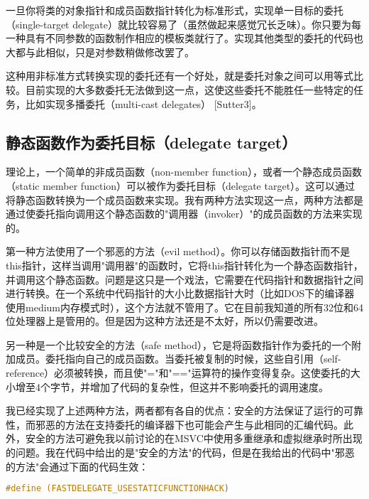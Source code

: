 \documentclass{article}
\begin{document}
\begin{CJK}{UTF8}{gbsn}
一旦你将类的对象指针和成员函数指针转化为标准形式，实现单一目标的委托（single-target delegate）就比较容易了（虽然做起来感觉冗长乏味）。你只要为每一种具有不同参数的函数制作相应的模板类就行了。实现其他类型的委托的代码也大都与此相似，只是对参数稍做修改罢了。

这种用非标准方式转换实现的委托还有一个好处，就是委托对象之间可以用等式比较。目前实现的大多数委托无法做到这一点，这使这些委托不能胜任一些特定的任务，比如实现多播委托（multi-cast delegates） [Sutter3]。

\subsection{静态函数作为委托目标（delegate target）}
理论上，一个简单的非成员函数（non-member function），或者一个静态成员函数（static member function）可以被作为委托目标（delegate target）。这可以通过将静态函数转换为一个成员函数来实现。我有两种方法实现这一点，两种方法都是通过使委托指向调用这个静态函数的"调用器（invoker）"的成员函数的方法来实现的。

第一种方法使用了一个邪恶的方法（evil method）。你可以存储函数指针而不是this指针，这样当调用"调用器"的函数时，它将this指针转化为一个静态函数指针，并调用这个静态函数。问题是这只是一个戏法，它需要在代码指针和数据指针之间进行转换。在一个系统中代码指针的大小比数据指针大时（比如DOS下的编译器使用medium内存模式时），这个方法就不管用了。它在目前我知道的所有32位和64位处理器上是管用的。但是因为这种方法还是不太好，所以仍需要改进。

另一种是一个比较安全的方法（safe method），它是将函数指针作为委托的一个附加成员。委托指向自己的成员函数。当委托被复制的时候，这些自引用（self-reference）必须被转换，而且使"="和"=="运算符的操作变得复杂。这使委托的大小增至4个字节，并增加了代码的复杂性，但这并不影响委托的调用速度。

我已经实现了上述两种方法，两者都有各自的优点：安全的方法保证了运行的可靠性，而邪恶的方法在支持委托的编译器下也可能会产生与此相同的汇编代码。此外，安全的方法可避免我以前讨论的在MSVC中使用多重继承和虚拟继承时所出现的问题。我在代码中给出的是"安全的方法"的代码，但是在我给出的代码中"邪恶的方法"会通过下面的代码生效：
\begin{lstlisting}[language=c++]
#define (FASTDELEGATE_USESTATICFUNCTIONHACK)
\end{lstlisting}


\end{CJK}
\end{document}
